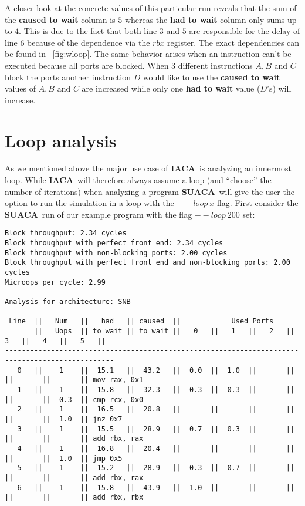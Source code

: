 \documentclass[a4paper,12pt,titlepage, twoside]{report}
\newcommand{\suaca}{\textbf{SUACA}}
\newcommand{\iaca}{\textbf{IACA}}
\begin{document}
A closer look at the concrete values of this particular run reveals that the sum of the \textbf{caused to wait} column is $5$ whereas the \textbf{had to wait} column only sums up to $4$. This is due to the fact that both line $3$ and $5$ are responsible for the delay of line $6$ because of the dependence via the $rbx$ register. The exact dependencies can be found in ~\autoref{fig:wloop}. The same behavior arises when an instruction can't be executed because all ports are blocked. When $3$ different instructions $A, B$ and $C$ block the ports another instruction $D$ would like to use the \textbf{caused to wait} values of $A, B$ and $C$ are increased while only one \textbf{had to wait} value ($D$'s) will increase.




\section{Loop analysis}
As we mentioned above the major use case of \iaca\ is analyzing an innermost loop. While \iaca\ will therefore always assume a loop (and ``choose'' the number of iterations) when analyzing a program \suaca\ will give the user the option to run the simulation in a loop with the $--loop\ x$ flag. First consider the \suaca\ run of our example program with the flag $--loop\ 200$ set:

\begin{Verbatim}[fontsize=\scriptsize]
Block throughput: 2.34 cycles
Block throughput with perfect front end: 2.34 cycles
Block throughput with non-blocking ports: 2.00 cycles
Block throughput with perfect front end and non-blocking ports: 2.00 cycles
Microops per cycle: 2.99

Analysis for architecture: SNB

 Line  ||   Num   ||   had   || caused  ||            Used Ports
       ||   Uops  || to wait || to wait ||   0   ||   1   ||   2   ||   3   ||   4   ||   5   ||
------------------------------------------------------------------------------------------------
   0   ||    1    ||  15.1   ||  43.2   ||  0.0  ||  1.0  ||       ||       ||       ||       || mov rax, 0x1
   1   ||    1    ||  15.8   ||  32.3   ||  0.3  ||  0.3  ||       ||       ||       ||  0.3  || cmp rcx, 0x0
   2   ||    1    ||  16.5   ||  20.8   ||       ||       ||       ||       ||       ||  1.0  || jnz 0x7
   3   ||    1    ||  15.5   ||  28.9   ||  0.7  ||  0.3  ||       ||       ||       ||       || add rbx, rax
   4   ||    1    ||  16.8   ||  20.4   ||       ||       ||       ||       ||       ||  1.0  || jmp 0x5
   5   ||    1    ||  15.2   ||  28.9   ||  0.3  ||  0.7  ||       ||       ||       ||       || add rbx, rax
   6   ||    1    ||  15.8   ||  43.9   ||  1.0  ||       ||       ||       ||       ||       || add rbx, rbx
\end{Verbatim}
\end{document}

